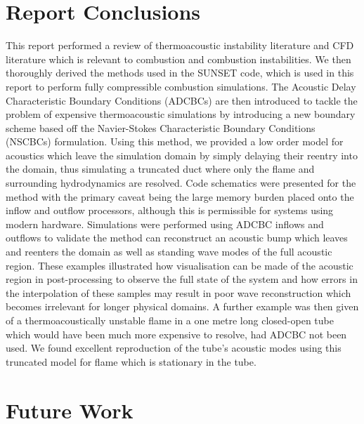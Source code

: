 \section{Report Conclusions}

This report performed a review of thermoacoustic instability literature and CFD literature which is relevant to combustion and combustion instabilities. We then thoroughly derived the methods used in the SUNSET code, which is used in this report to perform fully compressible combustion simulations. The Acoustic Delay Characteristic Boundary Conditions (ADCBCs) are then introduced to tackle the problem of expensive thermoacoustic simulations by introducing a new boundary scheme based off the Navier-Stokes Characteristic Boundary Conditions (NSCBCs) formulation. Using this method, we provided a low order model for acoustics which leave the simulation domain by simply delaying their reentry into the domain, thus simulating a truncated duct where only the flame and surrounding hydrodynamics are resolved. Code schematics were presented for the method with the primary caveat being the large memory burden placed onto the inflow and outflow processors, although this is permissible for systems using modern hardware. Simulations were performed using ADCBC inflows and outflows to validate the method can reconstruct an acoustic bump which leaves and reenters the domain as well as standing wave modes of the full acoustic region. These examples illustrated how visualisation can be made of the acoustic region in post-processing to observe the full state of the system and how errors in the interpolation of these samples may result in poor wave reconstruction which becomes irrelevant for longer physical domains. A further example was then given of a thermoacoustically unstable flame in a one metre long closed-open tube which would have been much more expensive to resolve, had ADCBC not been used. We found excellent reproduction of the tube's acoustic modes using this truncated model for flame which is stationary in the tube.




\section{Future Work}

